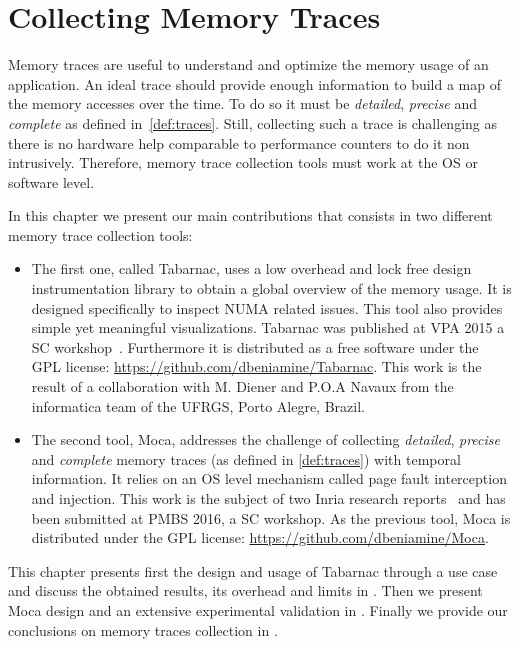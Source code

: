 \chapter{Collecting Memory Traces}

Memory traces are useful to understand and optimize the memory usage of an application.
An ideal trace should provide enough information to build a map of the memory accesses over the time.
To do so it must be \emph{detailed}, \emph{precise} and \emph{complete} as defined in~\ref{def:traces}.
Still, collecting such a trace is challenging as there is no hardware help comparable to performance counters to do it non intrusively.
Therefore, memory trace collection tools must work at the \gls{OS} or software level.

In this chapter we present our main contributions that consists in two different memory trace collection tools:
\begin{itemize}
    \item The first one, called \gls{Tabarnac}, uses a low overhead and lock free design instrumentation library to obtain a global overview of the memory usage.
        It is designed specifically to inspect \gls{NUMA} related issues.
        This tool also provides simple yet meaningful visualizations.
        \gls{Tabarnac} was published at \gls{VPA} 2015 a \gls{SC} workshop~\cite{Beniamine15TABARNAC}.
        Furthermore it is distributed as a free software under the \gls{GPL} license: \url{https://github.com/dbeniamine/Tabarnac}.
        This work is the result of a collaboration with M. Diener and P.O.A Navaux from the informatica team of the \gls{UFRGS}, Porto Alegre, Brazil.
    \item The second tool, \gls{Moca}, addresses the challenge of collecting \emph{detailed}, \emph{precise} and \emph{complete} memory traces (as defined in \ref{def:traces}) with temporal information.
        It relies on an \gls{OS} level mechanism called page fault interception and injection.
        This work is the subject of two Inria research reports~\cite{Beniamine15Memory,Beniamine16Moca} and has been submitted at \gls{PMBS} 2016, a \gls{SC} workshop.
        As the previous tool, \gls{Moca} is distributed under the \gls{GPL} license: \url{https://github.com/dbeniamine/Moca}.
\end{itemize}

This chapter presents first the design and usage of \gls{Tabarnac} through a use case and discuss the obtained results, its overhead and limits in .
Then we present \gls{Moca} design and an extensive experimental validation in .
Finally we provide our conclusions on memory traces collection in .


